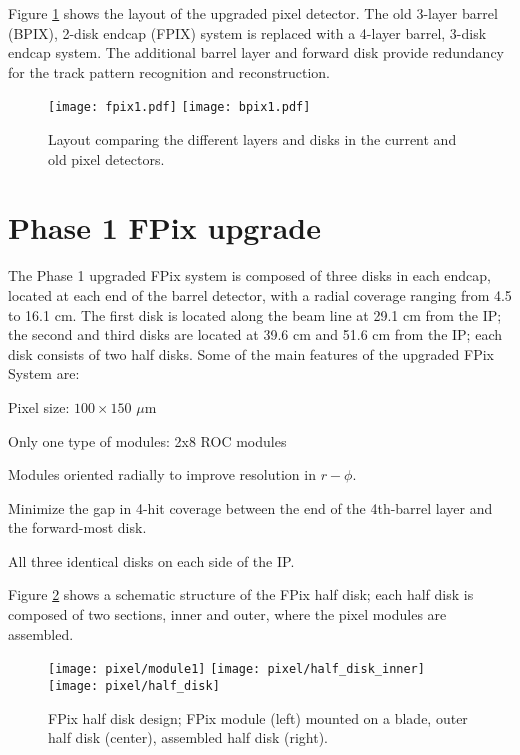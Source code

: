Figure \ref{fig:new_pix} shows the layout of the upgraded pixel detector. The old 3-layer barrel (BPIX), 2-disk endcap (FPIX) system is replaced with a 4-layer barrel, 3-disk endcap system. The additional barrel layer and forward disk provide redundancy for the track pattern recognition and reconstruction.

\begin{figure}[!h]
\centering
\texttt{[image: fpix1.pdf]}
\texttt{[image: bpix1.pdf]}
\caption[Layout of the upgraded and old pixel detectors.]{Layout comparing the different layers and disks in the current and old pixel detectors.}\label{fig:new_pix}
\end{figure}

\section{Phase 1 FPix upgrade}

The Phase 1 upgraded FPix system is composed of three disks in each endcap, located at each end of the barrel detector, with a radial coverage ranging from 4.5 to 16.1 cm. The first disk is located along the beam line at 29.1 cm from the IP; the second and third disks are located at 39.6 cm and 51.6 cm from the IP; each disk consists of two half disks. Some of the main features of the upgraded FPix System are:
\bit
\item Pixel size: $100 \times 150$ $\mu$m 
\item Only one type of modules: 2x8 ROC modules
\item Modules oriented radially to improve resolution in $r-\phi$.
\item Minimize the gap in 4-hit coverage between the end of the 4th-barrel layer and the forward-most disk.
\item All three identical disks on each side of the IP.
\eit

Figure \ref{fig:fpix_layout} shows a schematic structure of the FPix half disk; each half disk is composed of two sections, inner and outer, where the pixel modules are assembled.

\begin{figure}[!h]
  \centering
  \texttt{[image: pixel/module1]}
  \texttt{[image: pixel/half\_disk\_inner]}
  \texttt{[image: pixel/half\_disk]}
\caption[FPix half disk design.]{FPix half disk design; FPix module (left) mounted on a blade, outer half disk (center), assembled half disk (right).}\label{fig:fpix_layout}
\end{figure}

